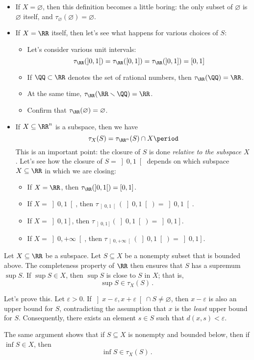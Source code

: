 \begin{exm}
	\begin{itemize}
		\item If $ X = \varnothing $, then this definition becomes a little boring:
			the only subset of $\varnothing$ is $\varnothing$ itself, and $\tau_{\varnothing}(\varnothing) = \varnothing$.
		\item If $ X = \RR$ itself, then let's see what happens for various choices of $S$:
			\begin{itemize}
				\item Let's consider various unit intervals:
					\[
						\tau_{\RR}(\left]0,1\right[) = \tau_{\RR}([0,1]) = \tau_{\RR}(\left]0,1\right]) = [0,1]
					\]
				\item If $\QQ \subset \RR$ denotes the set of rational numbers, then $\tau_{\RR}(\QQ) = \RR $.
				\item At the same time, $\tau_{\RR}(\RR \smallsetminus \QQ) = \RR$.
				\item Confirm that  $\tau_{\RR}(\varnothing)=\varnothing$.
			\end{itemize}
		\item If $ X \subseteq \RR^n$ is a subspace, then we have
			\[
				\tau_X(S) = \tau_{\RR^n}(S) \cap X \period
			\]
			This is an important point: the closure of $S$ is done \emph{relative to the subspace $X$}.
			Let's see how the closure of $S = \left]0,1\right[$ depends on which subspace $X \subseteq \RR $ in which we are closing:
			\begin{itemize}
				\item If $X=\RR$, then $\tau_{\RR}(\left]0,1\right[) = [0,1]$.
				\item If $X=\left]0,1\right[$, then $\tau_{\left]0,1\right[}(\left]0,1\right[) = \left]0,1\right[$.
				\item If $X=\left]0,1\right]$, then $\tau_{\left]0,1\right]}(\left]0,1\right[) = \left]0,1\right]$.
				\item If $X=\left]0,+\infty\right[$, then $\tau_{\left]0,+\infty\right[}(\left]0,1\right[) = \left]0,1\right]$.
			\end{itemize}
	\end{itemize}
\end{exm}

\begin{exm}
	Let $X \subseteq \RR$ be a subspace.
	Let $S \subseteq X$ be a nonempty subset that is bounded above.
	The completeness property of $\RR$ then ensures that $S$ has a supremum $\sup S$.
	If $\sup S \in X$, then $\sup S$ is close to $S$ in $X$;
	that is,
	\[
		\sup S \in \tau_X(S) \period
	\]

	Let's prove this.
	Let $\varepsilon>0$.
	If $ \left]x-\varepsilon, x+\varepsilon\right[ \cap S \neq \varnothing$, then $x-\varepsilon$ is also an upper bound for $S$, contradicting the assumption that $x$ is the \emph{least} upper bound for $S$.
	Consequently, there exists an element $ s \in S$ such that $d(x,s) < \varepsilon$.

	The same argument shows that if $S \subseteq X $ is nonempty and bounded below, then if $\inf S \in X$, then
	\[
		\inf S \in \tau_X(S) \period
	\]
\end{exm}

